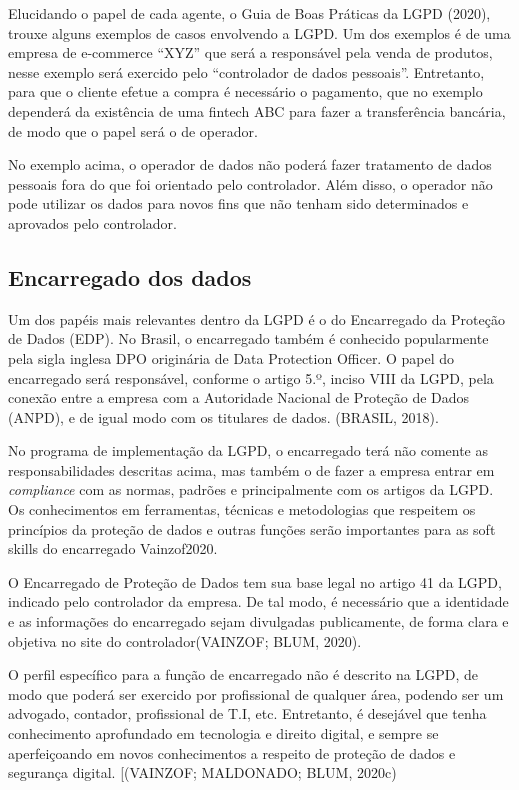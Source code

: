 \documentclass[
	12pt,				%
	openright,			%
	oneside,			%
	a4paper,			%
	english,			%
	french,				%
	spanish,			%
	brazil,				%
	]{abntex2}
\begin{document}
Elucidando o papel de cada agente, o Guia de Boas Práticas da LGPD (2020), trouxe alguns exemplos de casos envolvendo a LGPD. Um dos exemplos é de uma empresa de e-commerce “XYZ” que será a responsável pela venda de produtos, nesse exemplo será exercido pelo “controlador de dados pessoais”. Entretanto, para que o cliente efetue a compra é necessário o pagamento, que no exemplo dependerá da existência de uma fintech ABC para fazer a transferência bancária, de modo que o papel será o de operador.

No exemplo acima, o operador de dados não poderá fazer tratamento de dados pessoais fora do que foi orientado pelo controlador. Além disso, o operador não pode utilizar os dados para novos fins que não tenham sido determinados e aprovados pelo controlador.

\subsection{Encarregado dos dados}

Um dos papéis mais relevantes dentro da LGPD é o do Encarregado da Proteção de Dados (EDP). No Brasil, o encarregado também é conhecido popularmente pela sigla inglesa DPO originária de Data Protection Officer. O papel do encarregado será responsável, conforme o artigo 5.º, inciso VIII da LGPD, pela conexão entre a empresa com a Autoridade Nacional de Proteção de Dados (ANPD), e de igual modo com os titulares de dados. (BRASIL, 2018). 

No programa de implementação da LGPD, o encarregado terá não comente as responsabilidades descritas acima, mas também o de fazer a empresa entrar em \textit{compliance} com as normas, padrões e principalmente com os artigos da LGPD. Os conhecimentos em ferramentas, técnicas e metodologias que respeitem os princípios da proteção de dados e outras funções serão importantes para as soft skills do encarregado Vainzof2020.

O Encarregado de Proteção de Dados tem sua base legal no artigo 41 da LGPD, indicado pelo controlador da empresa. De tal modo, é necessário que a identidade e as informações do encarregado sejam divulgadas publicamente, de forma clara e objetiva no site do controlador(VAINZOF; BLUM, 2020).

O perfil específico para a função de encarregado não é descrito na LGPD, de modo que poderá ser exercido por profissional de qualquer área, podendo ser um advogado, contador, profissional de T.I, etc. Entretanto, é desejável que tenha conhecimento aprofundado em tecnologia e direito digital, e sempre se aperfeiçoando em novos conhecimentos a respeito de proteção de dados e segurança digital. [(VAINZOF; MALDONADO; BLUM, 2020c)
\end{document}
